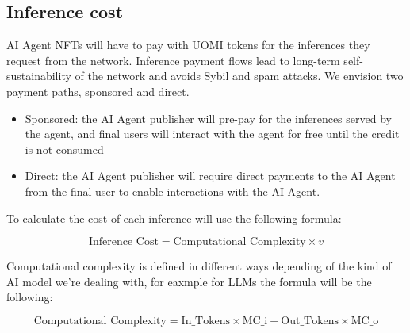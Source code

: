 \documentclass{article}
\begin{document}
\subsection{Inference cost}

AI Agent NFTs will have to pay with UOMI tokens for the inferences they request from the network. Inference payment flows lead to long-term self-sustainability of the network and avoids Sybil and spam attacks. We envision two payment paths, sponsored and direct.

\begin{itemize}
\item Sponsored: the AI Agent publisher will pre-pay for the inferences served by the agent, and final users will interact with the agent for free until the credit is not consumed

\item Direct:  the AI Agent publisher will require direct payments to the AI Agent from the final user to enable interactions with the AI Agent.

\end{itemize}

To calculate the cost of each inference will use the following formula:





\[ \text{Inference Cost} = \text{Computational Complexity} \times v \]



Computational complexity is defined in different ways depending of the kind of AI model we’re dealing with, for eaxmple for LLMs the formula will be the following:

\[\text{Computational Complexity} = \text{In\_Tokens} \times \text{MC\_i} + \text{Out\_Tokens} \times \text{MC\_o} \]
\end{document}
